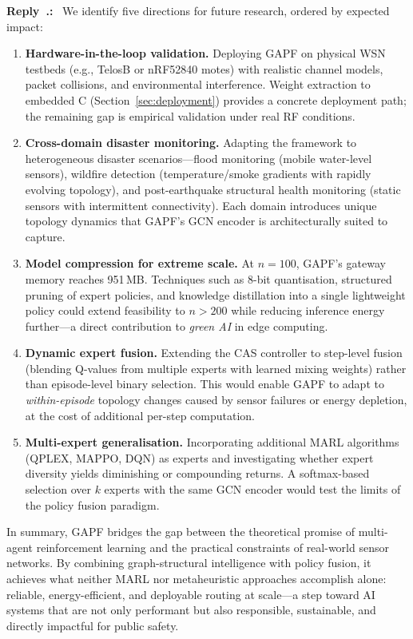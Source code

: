 \documentclass[11pt]{article}
\newcounter{reviewer}
\newcounter{replyctr}[reviewer]
\renewcommand{\thereplyctr}{\thereviewer.\arabic{replyctr}}
\newenvironment{reply}
  {\refstepcounter{replyctr}%
   \addtocounter{replyctr}{-1}%
   \medskip\noindent
   \begin{sf}\textbf{Reply~\thereplyctr:}\ }
  {\addtocounter{replyctr}{1}%
   \medskip\end{sf}}
\begin{document}
\begin{refsection}
\begin{mdframed}[style=Resp]
\begin{reply}
We identify five directions for future research, ordered by expected impact:

\begin{enumerate}
    \item \textbf{Hardware-in-the-loop validation.} Deploying GAPF on physical WSN testbeds (e.g., TelosB or nRF52840 motes) with realistic channel models, packet collisions, and environmental interference. Weight extraction to embedded C (Section~\ref{sec:deployment}) provides a concrete deployment path; the remaining gap is empirical validation under real RF conditions.
    
    \item \textbf{Cross-domain disaster monitoring.} Adapting the framework to heterogeneous disaster scenarios---flood monitoring (mobile water-level sensors), wildfire detection (temperature/smoke gradients with rapidly evolving topology), and post-earthquake structural health monitoring (static sensors with intermittent connectivity). Each domain introduces unique topology dynamics that GAPF's GCN encoder is architecturally suited to capture.
    
    \item \textbf{Model compression for extreme scale.} At $n{=}100$, GAPF's gateway memory reaches 951\,MB. Techniques such as 8-bit quantisation, structured pruning of expert policies, and knowledge distillation into a single lightweight policy could extend feasibility to $n > 200$ while reducing inference energy further---a direct contribution to \emph{green AI} in edge computing.
    
    \item \textbf{Dynamic expert fusion.} Extending the CAS controller to step-level fusion (blending Q-values from multiple experts with learned mixing weights) rather than episode-level binary selection. This would enable GAPF to adapt to \emph{within-episode} topology changes caused by sensor failures or energy depletion, at the cost of additional per-step computation.
    
    \item \textbf{Multi-expert generalisation.} Incorporating additional MARL algorithms (QPLEX, MAPPO, DQN) as experts and investigating whether expert diversity yields diminishing or compounding returns. A softmax-based selection over $k$ experts with the same GCN encoder would test the limits of the policy fusion paradigm.
\end{enumerate}

\medskip
\noindent In summary, GAPF bridges the gap between the theoretical promise of multi-agent reinforcement learning and the practical constraints of real-world sensor networks. By combining graph-structural intelligence with policy fusion, it achieves what neither MARL nor metaheuristic approaches accomplish alone: reliable, energy-efficient, and deployable routing at scale---a step toward AI systems that are not only performant but also responsible, sustainable, and directly impactful for public safety.


\end{reply}
\end{mdframed}
\end{refsection}
\end{document}
